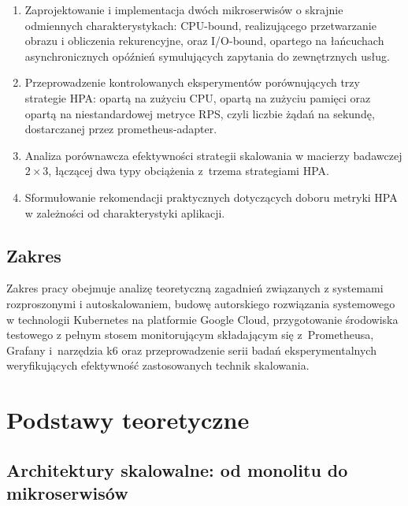 \begin{enumerate}
  \item Zaprojektowanie i implementacja dwóch mikroserwisów o skrajnie odmiennych charakterystykach: CPU-bound, realizującego przetwarzanie obrazu i obliczenia rekurencyjne, oraz I/O-bound, opartego na łańcuchach asynchronicznych opóźnień symulujących zapytania do zewnętrznych usług.
  \item Przeprowadzenie kontrolowanych eksperymentów porównujących trzy strategie HPA: opartą na zużyciu CPU, opartą na zużyciu pamięci oraz opartą na niestandardowej metryce RPS, czyli liczbie żądań na sekundę, dostarczanej przez prometheus-adapter.
  \item Analiza porównawcza efektywności strategii skalowania w macierzy badawczej $2 \times 3$, łączącej dwa typy obciążenia z~trzema strategiami HPA.
  \item Sformułowanie rekomendacji praktycznych dotyczących doboru metryki HPA w zależności od charakterystyki aplikacji.
\end{enumerate}

\subsection{Zakres}

Zakres pracy obejmuje analizę teoretyczną zagadnień związanych z systemami rozproszonymi i autoskalowaniem, budowę autorskiego rozwiązania systemowego w technologii Kubernetes na platformie Google Cloud, przygotowanie środowiska testowego z pełnym stosem monitorującym składającym się z~Prometheusa, Grafany i~narzędzia k6 oraz przeprowadzenie serii badań eksperymentalnych weryfikujących efektywność zastosowanych technik skalowania.

\section{Podstawy teoretyczne}

\subsection{Architektury skalowalne: od monolitu do mikroserwisów}

